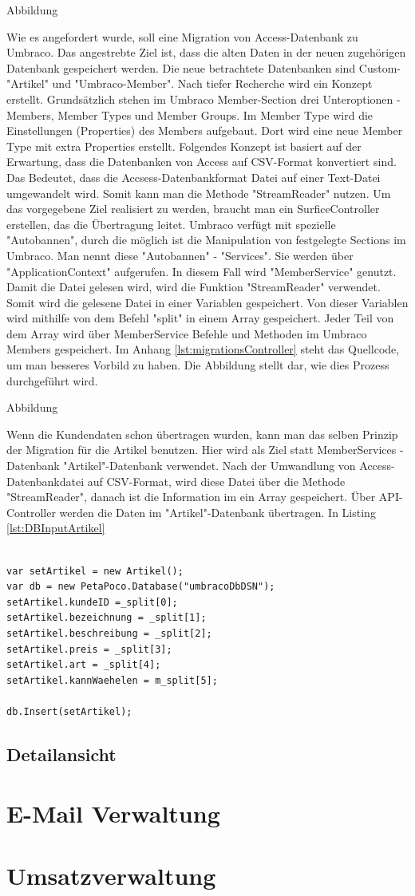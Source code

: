 Abbildung
 
Wie es angefordert wurde, soll eine Migration von Access-Datenbank zu Umbraco. Das angestrebte Ziel ist, dass die alten Daten in der neuen zugehörigen Datenbank gespeichert werden. Die neue betrachtete Datenbanken sind Custom-"Artikel" und "Umbraco-Member". 
Nach tiefer Recherche wird ein Konzept erstellt. 
Grundsätzlich stehen im Umbraco Member-Section \cite{OurUmbraco2018} drei Unteroptionen - Members, Member Types und Member Groups.
Im Member Type wird die Einstellungen (Properties) des Members aufgebaut. Dort wird eine neue Member Type mit extra Properties erstellt. 
Folgendes Konzept ist basiert auf der Erwartung, dass die Datenbanken von Access auf CSV-Format konvertiert sind. Das Bedeutet, dass die Accsess-Datenbankformat Datei auf einer Text-Datei umgewandelt wird. Somit kann man die Methode "StreamReader" nutzen.
Um das vorgegebene Ziel realisiert zu werden, braucht man ein SurficeController erstellen, das die Übertragung leitet. 
Umbraco verfügt mit spezielle "Autobannen", durch die möglich ist die Manipulation von festgelegte Sections im Umbraco. Man nennt diese "Autobannen" - "Services". Sie werden über "ApplicationContext" aufgerufen. In diesem Fall wird "MemberService" genutzt.
Damit die Datei gelesen wird, wird die Funktion "StreamReader" verwendet. Somit wird die gelesene Datei in einer Variablen gespeichert. Von dieser Variablen wird mithilfe von dem Befehl "split" in einem Array gespeichert. Jeder Teil von dem Array wird über MemberService Befehle und Methoden im Umbraco Members gespeichert. Im Anhang \ref{lst:migrationsController} steht das Quellcode, um man besseres Vorbild zu haben.
Die Abbildung stellt dar, wie dies Prozess durchgeführt wird.

Abbildung 

Wenn die Kundendaten schon übertragen wurden, kann man das selben Prinzip der Migration für die Artikel benutzen. Hier wird als Ziel statt MemberServices - Datenbank "Artikel"-Datenbank  verwendet. Nach der Umwandlung von Access-Datenbankdatei auf CSV-Format, wird diese Datei über die Methode "StreamReader", danach ist die Information im ein Array gespeichert. Über API-Controller werden die Daten im "Artikel"-Datenbank übertragen. In Listing \ref{lst:DBInputArtikel}

\begin{lstlisting}[caption={Datenbank "Artikel" - Transfer}, label=lst:DBInputArtikel]

var setArtikel = new Artikel();
var db = new PetaPoco.Database("umbracoDbDSN");
setArtikel.kundeID =_split[0];
setArtikel.bezeichnung = _split[1];
setArtikel.beschreibung = _split[2];
setArtikel.preis = _split[3];
setArtikel.art = _split[4];
setArtikel.kannWaehelen = m_split[5];

db.Insert(setArtikel);
\end{lstlisting}

\subsection{Detailansicht}


\section{E-Mail Verwaltung}
\section{Umsatzverwaltung}


